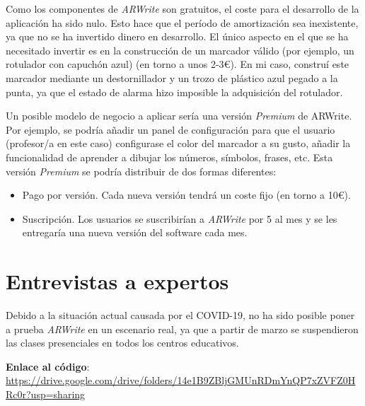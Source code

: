 \documentclass[12pt,spanish]{article}
\begin{document}
Como los componentes de \emph{ARWrite} son gratuitos, el coste para el desarrollo de la aplicación ha sido nulo. Esto hace que el período de amortización sea inexistente, ya que no se ha invertido dinero en desarrollo. El único aspecto en el que se ha necesitado invertir es en la construcción de un marcador válido (por ejemplo, un rotulador con capuchón azul) (en torno a unos 2-3\euro). En mi caso, construí este marcador mediante un destornillador y un trozo de plástico azul pegado a la punta, ya que el estado de alarma hizo imposible la adquisición del rotulador.

Un posible modelo de negocio a aplicar sería una versión \emph{Premium} de ARWrite. Por ejemplo, se podría añadir un panel de configuración para que el usuario (profesor/a en este caso) configurase el color del marcador a su gusto, añadir la funcionalidad de aprender a dibujar los números, símbolos, frases, etc. Esta versión \emph{Premium} se podría distribuir de dos formas diferentes:
\begin{itemize}
  \item Pago por versión. Cada nueva versión tendrá un coste fijo (en torno a 10\euro).
  \item Suscripción. Los usuarios se suscribirían a \emph{ARWrite} por 5  al mes y se les entregaría una nueva versión del software cada mes.
\end{itemize}

\section{Entrevistas a expertos}

Debido a la situación actual causada por el COVID-19, no ha sido posible poner a prueba \emph{ARWrite} en un escenario real, ya que a partir de marzo se suspendieron las clases presenciales en todos los centros educativos.

\textbf{Enlace al código}:\\
 \href{https://drive.google.com/drive/folders/14e1B9ZBljGMUnRDmYnQP7xZVFZ0HRc0r?usp=sharing}{https://drive.google.com/drive/folders/14e1B9ZBljGMUnRDmYnQP7xZVFZ0HRc0r?usp=sharing}

\nocite{tutorial}
\newpage


\end{document}
